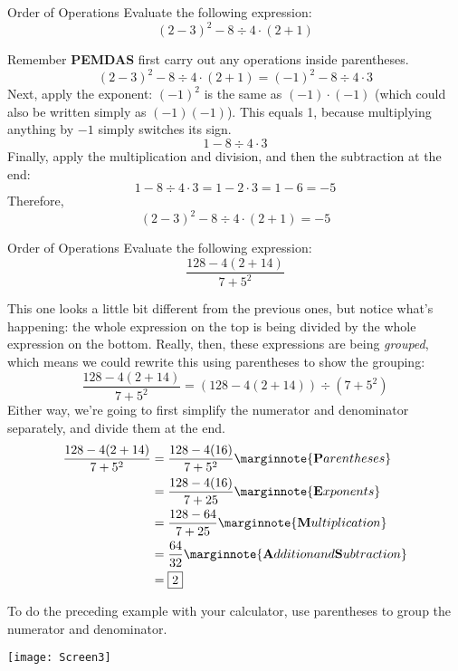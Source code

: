 \begin{example}{Order of Operations}
Evaluate the following expression:
\[(2-3)^2 - 8 \div 4 \cdot (2+1)\]

\sol
Remember \textbf{PEMDAS} first carry out any operations inside parentheses.
\[(2-3)^2 - 8 \div 4 \cdot (2+1) = (-1)^2 - 8 \div 4 \cdot 3\]
Next, apply the exponent: $(-1)^2$ is the same as $(-1) \cdot (-1)$ (which could also be written simply as $(-1)(-1)$).  This equals 1, because multiplying anything by $-1$ simply switches its sign.
\[1 - 8 \div 4 \cdot 3\]
Finally, apply the multiplication and division, and then the subtraction at the end:
\[1-8\div 4 \cdot 3 = 1 - 2 \cdot 3 = 1-6 = -5\]
Therefore, \[(2-3)^2 - 8 \div 4 \cdot (2+1) = \boxed{-5}\]
\end{example}

\begin{example}{Order of Operations}
Evaluate the following expression:
\[\dfrac{128-4(2+14)}{7+5^2}\]

\sol
This one looks a little bit different from the previous ones, but notice what's happening: the whole expression on the top is being divided by the whole expression on the bottom.  Really, then, these expressions are being \textit{grouped}, which means we could rewrite this using parentheses to show the grouping:
\[\dfrac{128-4(2+14)}{7+5^2} = (128-4(2+14)) \div (7+5^2)\]
Either way, we're going to first simplify the numerator and denominator separately, and divide them at the end.
\begin{align*}
\dfrac{128-4(2+14)}{7+5^2} &= \dfrac{128-4(16)}{7+5^2}\marginnote{\textbf{P}arentheses}\\
&= \dfrac{128-4(16)}{7+25}\marginnote{\textbf{E}xponents}\\
&= \dfrac{128-64}{7+25}\marginnote{\textbf{M}ultiplication}\\
&= \dfrac{64}{32}\marginnote{\textbf{A}ddition and \textbf{S}ubtraction}\\
&= \boxed{2}
\end{align*}
\end{example}

To do the preceding example with your calculator, use parentheses to group the numerator and denominator.
\begin{center}
\texttt{[image: Screen3]}
\end{center}

